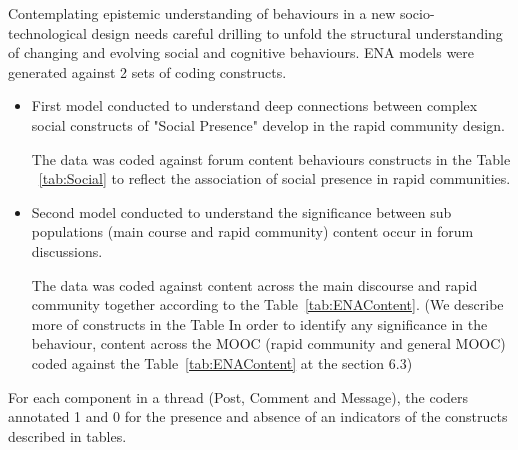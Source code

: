 \documentclass[manuscript,screen,review]{acmart}
\begin{document}
Contemplating epistemic understanding of behaviours in a new socio-technological design needs careful drilling to unfold the structural understanding of changing and evolving social and cognitive behaviours. ENA models were generated against 2 sets of coding constructs. 
\begin{itemize}
    \item First model conducted to understand deep connections between complex social constructs of "Social Presence" develop in the rapid community design. 
    
    The data was coded against forum content behaviours constructs in the Table ~\ref{tab:Social} to reflect the association of social presence in rapid communities.
    
    
    \item Second model conducted to understand the significance between sub populations (main course and rapid community) content occur in forum discussions. 
    
    The data was coded against content across the main discourse and rapid community together according to the Table~\ref{tab:ENAContent}. (We describe more of constructs in the Table In order to identify any significance in the behaviour, content across the MOOC (rapid community and general MOOC) coded against the Table~\ref{tab:ENAContent} at the section 6.3)
    
\end{itemize}    

For each component in a thread (Post, Comment and Message), the coders annotated 1 and 0 for the presence and absence of an indicators of the constructs described in tables.  
\end{document}
